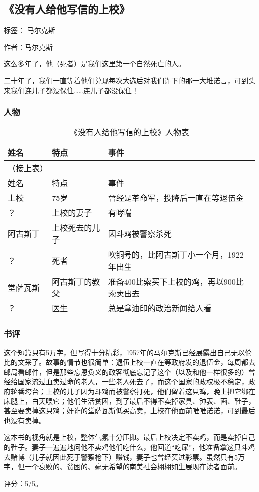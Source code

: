 \subsection{《没有人给他写信的上校》}

标签： 马尔克斯

作者：马尔克斯

这么多年了，他（死者）是我们这里第一个自然死亡的人。

二十年了，我们一直等着他们兑现每次大选后对我们许下的那一大堆诺言，可到头来我们连儿子都没保住……连儿子都没保住！

\subsubsection{人物}

\begin{longtable}{p{} | p{} | p{}}

    \caption{《没有人给他写信的上校》人物表} \\
    \hline
姓名 & 特点 & 事件 \\
\hline
\endfirsthead

（接上表） \\
姓名 & 特点 & 事件 \\
\hline
\endhead

\hline
\endfoot

上校 &75岁 & 曾经是革命军，投降后一直在等退伍金 \\
 ？ & 上校的妻子 & 有哮喘 \\
 阿古斯丁 & 上校死去的儿子 & 因斗鸡被警察杀死 \\
 ？ & 死者 & 吹铜号的，比阿古斯丁小一个月，1922年出生 \\
堂萨瓦斯 & 阿古斯丁的教父 & 准备400比索买下上校的鸡，再以900比索卖出去 \\
？ & 医生 & 总是拿油印的政治新闻给人看 \\
\end{longtable}

\subsubsection{书评}
这个短篇只有5万字，但写得十分精彩，1957年的马尔克斯已经展露出自己无以伦比的文采了。故事的情节也很简单：退伍上校一直在等政府发的退伍金，每周都去邮局看邮件，但是那些忘恩负义的政客彻底忘记了这个（以及和他一样很多的）曾经给国家流过血卖过命的老人，一些老人死去了，而这个国家的政权极不稳定，政府轮番垮台；上校的儿子因为斗鸡而被警察打死，他们留着这只鸡，晚上把它绑在床腿上，白天喂它；他们生活贫困，到了最后不得不卖掉家具、钟表、画、鞋子，甚至要卖掉这只鸡；奸诈的堂萨瓦斯低买高卖，上校在他面前唯唯诺诺，可到最后也没有卖掉。

这本书的视角就是上校，整体气氛十分压抑。最后上校决定不卖鸡，而是卖掉自己的鞋子。妻子一遍遍地问他不卖鸡他们吃什么，他回道“吃屎”，他准备拿这只斗鸡去赌博（儿子就因此死于警察枪下）赚钱，妻子也曾经买过彩票。虽然只有5万字，但一个衰败的、贫困的、毫无希望的南美社会栩栩如生展现在读者面前。

评分：5/5。